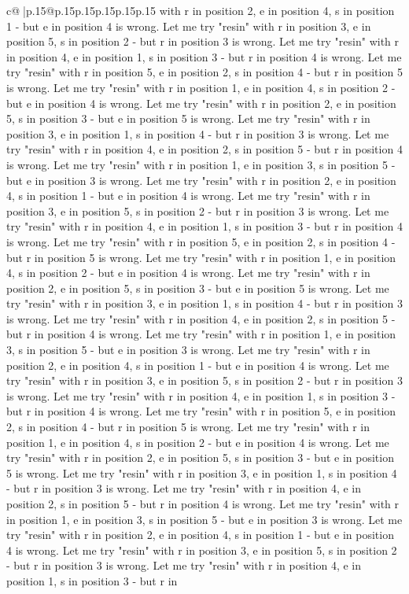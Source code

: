 \documentclass{article}
\begin{document}
{\begin{supertabular}{c@{$\;$}|p{.15\linewidth}@{}p{.15\linewidth}p{.15\linewidth}p{.15\linewidth}p{.15\linewidth}p{.15\linewidth}}
{{{with r in position 2, e in position 4, s in position 1 {-} but e in position 4 is wrong. Let me try "resin" with r in position 3, e in position 5, s in position 2 {-} but r in position 3 is wrong. Let me try "resin" with r in position 4, e in position 1, s in position 3 {-} but r in position 4 is wrong. Let me try "resin" with r in position 5, e in position 2, s in position 4 {-} but r in position 5 is wrong. Let me try "resin" with r in position 1, e in position 4, s in position 2 {-} but e in position 4 is wrong. Let me try "resin" with r in position 2, e in position 5, s in position 3 {-} but e in position 5 is wrong. Let me try "resin" with r in position 3, e in position 1, s in position 4 {-} but r in position 3 is wrong. Let me try "resin" with r in position 4, e in position 2, s in position 5 {-} but r in position 4 is wrong. Let me try "resin" with r in position 1, e in position 3, s in position 5 {-} but e in position 3 is wrong. Let me try "resin" with r in position 2, e in position 4, s in position 1 {-} but e in position 4 is wrong. Let me try "resin" with r in position 3, e in position 5, s in position 2 {-} but r in position 3 is wrong. Let me try "resin" with r in position 4, e in position 1, s in position 3 {-} but r in position 4 is wrong. Let me try "resin" with r in position 5, e in position 2, s in position 4 {-} but r in position 5 is wrong. Let me try "resin" with r in position 1, e in position 4, s in position 2 {-} but e in position 4 is wrong. Let me try "resin" with r in position 2, e in position 5, s in position 3 {-} but e in position 5 is wrong. Let me try "resin" with r in position 3, e in position 1, s in position 4 {-} but r in position 3 is wrong. Let me try "resin" with r in position 4, e in position 2, s in position 5 {-} but r in position 4 is wrong. Let me try "resin" with r in position 1, e in position 3, s in position 5 {-} but e in position 3 is wrong. Let me try "resin" with r in position 2, e in position 4, s in position 1 {-} but e in position 4 is wrong. Let me try "resin" with r in position 3, e in position 5, s in position 2 {-} but r in position 3 is wrong. Let me try "resin" with r in position 4, e in position 1, s in position 3 {-} but r in position 4 is wrong. Let me try "resin" with r in position 5, e in position 2, s in position 4 {-} but r in position 5 is wrong. Let me try "resin" with r in position 1, e in position 4, s in position 2 {-} but e in position 4 is wrong. Let me try "resin" with r in position 2, e in position 5, s in position 3 {-} but e in position 5 is wrong. Let me try "resin" with r in position 3, e in position 1, s in position 4 {-} but r in position 3 is wrong. Let me try "resin" with r in position 4, e in position 2, s in position 5 {-} but r in position 4 is wrong. Let me try "resin" with r in position 1, e in position 3, s in position 5 {-} but e in position 3 is wrong. Let me try "resin" with r in position 2, e in position 4, s in position 1 {-} but e in position 4 is wrong. Let me try "resin" with r in position 3, e in position 5, s in position 2 {-} but r in position 3 is wrong. Let me try "resin" with r in position 4, e in position 1, s in position 3 {-} but r in }}}
\end{supertabular}}
\end{document}
